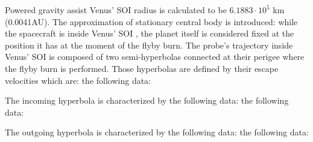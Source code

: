 \documentclass[11pt,a4paper]{report}
\begin{document}
Powered gravity assist
Venus’ SOI radius is calculated to be $6.1883\cdot10^{5}$ km (0.0041AU).
The approximation of stationary central body is introduced: while the spacecraft is inside Venus’ SOI , the planet itself is considered fixed at the position it has at the moment of the flyby burn.
The probe’s trajectory inside Venus’ SOI is composed of two semi-hyperbolas connected at their perigee where the flyby burn is performed. Those hyperbolas are defined by their escape velocities which are:
the following data:

\begin{table}[H]
\centering
{}
\end{table}

The incoming hyperbola is characterized by the following data:
the following data:

\begin{table}[H]
\centering
{}
\end{table}

The outgoing hyperbola is characterized by the following data:
the following data:

\begin{table}[H]
\centering
{}
\end{table}
\end{document}
